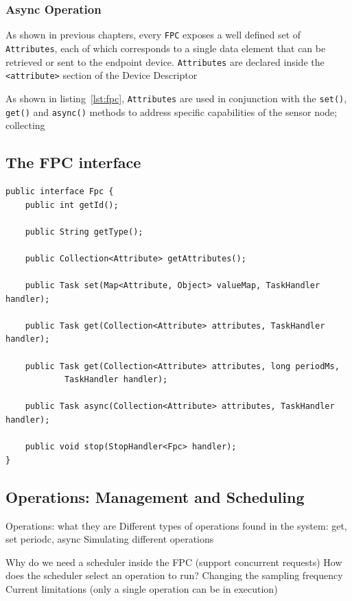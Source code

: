 \subsubsection{Async Operation}

As shown in previous chapters, every \texttt{FPC} exposes a well defined set of
\texttt{Attributes}, each of which corresponds to a single data element that
can be retrieved or sent to the endpoint device. \texttt{Attributes} are
declared inside the \lstinline!<attribute>! section of the Device Descriptor


As shown in listing~\ref{lst:fpc}, \texttt{Attributes} are
used in conjunction with the \texttt{set()}, \texttt{get()} and
\texttt{async()} methods to address specific capabilities of the sensor node;
collecting  

\subsection{The FPC interface}

\lstset{language=java}
\begin{lstlisting}[float,caption=The FPC interface,label={lst:fpc}]
public interface Fpc {
    public int getId();

    public String getType();

    public Collection<Attribute> getAttributes();

    public Task set(Map<Attribute, Object> valueMap, TaskHandler handler);

    public Task get(Collection<Attribute> attributes, TaskHandler handler);

    public Task get(Collection<Attribute> attributes, long periodMs,
            TaskHandler handler);

    public Task async(Collection<Attribute> attributes, TaskHandler handler);

    public void stop(StopHandler<Fpc> handler);
}
\end{lstlisting}

\subsection{Operations: Management and Scheduling}
\label{sec:fpc.operation}

Operations: what they are
Different types of operations found in the system: get, set periodc, async
Simulating different operations

Why do we need a scheduler inside the FPC (support concurrent requests)
How does the scheduler select an operation to run?
Changing the sampling frequency
Current limitations (only a single operation can be in execution)


